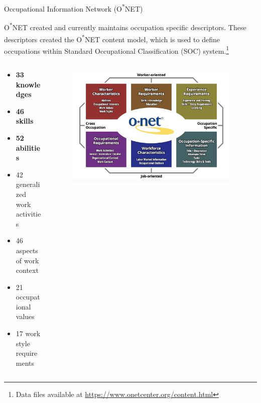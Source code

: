 \documentclass{beamer}
\begin{document}
\begin{frame}{Occupational Information Network (O\textsuperscript{*}NET)}

  O\textsuperscript{*}NET created and currently maintains occupation specific descriptors. These descriptors created the O\textsuperscript{*}NET content model, which is used to define occupations within Standard Occupational Classification (SOC) system.\footnote{Data files available at \href{https://www.onetcenter.org/content.html}{https://www.onetcenter.org/content.html}}
  \begin{columns}
    \begin{column}{0.4\textwidth}
      \begin{itemize}
        \item \textbf{33 knowledges}\cite{knowledges}
        \item \textbf{46 skills}\cite{skills}
        \item \textbf{52 abilities}\cite{abilities}
        \item 42 generalized work activities
        \item 46 aspects of work context
        \item 21 occupational values
        \item 17 work style requirements
      \end{itemize}
    \end{column}
    \begin{column}{0.6\textwidth}
      \begin{figure}[ht!]
        \centering
        \includegraphics[width=0.95\textwidth]{images/onet.png}
      \end{figure}
    \end{column}
  \end{columns}
\end{frame}
\end{document}
